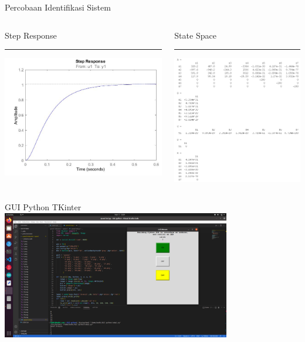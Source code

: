 \documentclass[10pt,xcolor={dvipsnames}]{beamer}
\begin{document}
\begin{frame}{Percobaan Identifikasi Sistem}
	\begin{columns}[T] %
		\begin{column}{0.48\textwidth}
			Step Response
			\color{black}\rule{\linewidth}{4pt}
			\includegraphics[width=7.5cm]{Coba Sistem Identification/tf1.jpg}
		\end{column}%
		\hfill%
		\begin{column}{0.48\textwidth}
			State Space
			\color{blue}\rule{\linewidth}{4pt}
			\begin{center}
				\includegraphics[width=6cm]{Coba Sistem Identification/ss1.png}
			\end{center}
		\end{column}
	\end{columns}
\end{frame}


\begin{frame}{GUI Python TKinter}
	\centering
	\includegraphics[width=10cm]{Gambar Lain/guitkinter.png}
\end{frame}
\end{document}
